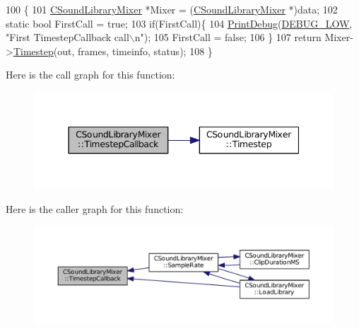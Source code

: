 \begin{DoxyCode}
100                                                                                                            
                                                                      \{
101     \hyperlink{classCSoundLibraryMixer}{CSoundLibraryMixer} *Mixer = (\hyperlink{classCSoundLibraryMixer}{CSoundLibraryMixer} *)data;
102 \textcolor{keyword}{static} \textcolor{keywordtype}{bool} FirstCall = \textcolor{keyword}{true};
103 \textcolor{keywordflow}{if}(FirstCall)\{
104     \hyperlink{Debug_8h_aa5f00f5537c9760f6ae1782460748ab9}{PrintDebug}(\hyperlink{Debug_8h_a3a5f3fc09784650d8388cb854882f840}{DEBUG\_LOW}, \textcolor{stringliteral}{"First TimestepCallback call\(\backslash\)n"});
105     FirstCall = \textcolor{keyword}{false};   
106 \}
107     \textcolor{keywordflow}{return} Mixer->\hyperlink{classCSoundLibraryMixer_ad3ef0b67b77862e8c88949c3415095e7}{Timestep}(out, frames, timeinfo, status);
108 \}
\end{DoxyCode}
Here is the call graph for this function\+:\nopagebreak
\begin{figure}[H]
\begin{center}
\leavevmode
\includegraphics[width=344pt]{classCSoundLibraryMixer_a1d04553aa93769b8bff4bb5c8b7bdfa1_cgraph}
\end{center}
\end{figure}
Here is the caller graph for this function\+:\nopagebreak
\begin{figure}[H]
\begin{center}
\leavevmode
\includegraphics[width=350pt]{classCSoundLibraryMixer_a1d04553aa93769b8bff4bb5c8b7bdfa1_icgraph}
\end{center}
\end{figure}


